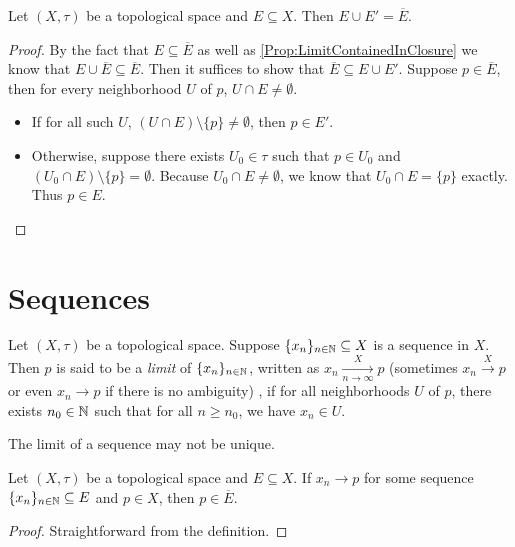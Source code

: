 \documentclass[screen]{techreport}
\numberwithin{equation}{section}
\begin{document}
\begin{proposition}\label{Prop:OrigPlusLimitIsClosure}
	Let $(X,\tau)$ be a topological space and $E \subseteq X$.
	Then $E \cup E' = \overline{E}$.
\end{proposition}
\begin{proof}
	By the fact that $E \subseteq \overline{E}$ as well as \cref{Prop:LimitContainedInClosure} we know that $E \cup \overline{E} \subseteq \overline{E}$.
	Then it suffices to show that $\overline{E} \subseteq E \cup E'$.
	Suppose $p \in \overline{E}$, then for every neighborhood $U$ of $p$, $U \cap E \neq \emptyset$.
	\begin{itemize}
		\item If for all such $U$, $(U \cap E) \setminus \{p\} \neq \emptyset$, then $p \in E'$.
		\item Otherwise, suppose there exists $U_0 \in \tau$ such that $p \in U_0$ and $(U_0 \cap E) \setminus \{p\} = \emptyset$. Because $U_0 \cap E \neq \emptyset$, we know that $U_0 \cap E = \{ p\}$ exactly. Thus $p \in E$.
	\end{itemize}
\end{proof}

\section{Sequences}

\begin{definition}\label{De:Sequences}
	Let $(X,\tau)$ be a topological space.
	Suppose $\{x_n\}_{n \in \mathbb{N}} \subseteq X$ is a sequence in $X$.
	Then $p$ is said to be a \emph{limit} of $\{x_n\}_{n \in \mathbb{N}}$, written as $x_n \xrightarrow[n \to \infty]{X} p$ (sometimes $x_n \xrightarrow{X} p$ or even $x_n \rightarrow p$ if there is no ambiguity) , if for all neighborhoods $U$ of $p$, there exists $n_0 \in \mathbb{N}$ such that for all $n \ge n_0$, we have $x_n \in U$.
\end{definition}

\begin{remark}\label{Rem:LimitOfSeqNotUnique}
	The limit of a sequence may not be unique.
\end{remark}

\begin{lemma}\label{Lem:LimitOfSeqInClosure}
	Let $(X,\tau)$ be a topological space and $E \subseteq X$.
	If $x_n \rightarrow p$ for some sequence $\{x_n\}_{n \in \mathbb{N}} \subseteq E$ and $p \in X$, then $p \in \overline{E}$.
\end{lemma}
\begin{proof}
	Straightforward from the definition.
\end{proof}
\end{document}
